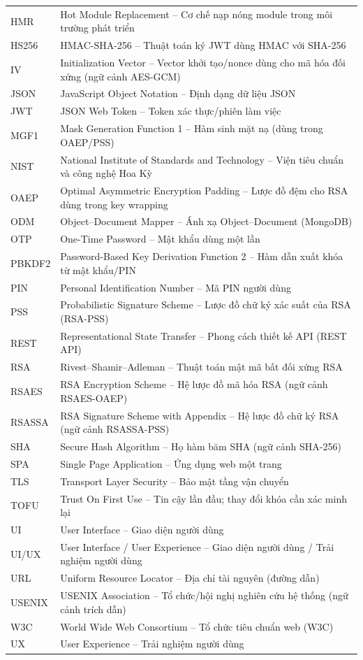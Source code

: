 \begin{longtable}{@{}p{}p{}@{}}
HMR   & Hot Module Replacement -- Cơ chế nạp nóng module trong môi trường phát triển \\
HS256 & HMAC-SHA-256 -- Thuật toán ký JWT dùng HMAC với SHA-256 \\
IV    & Initialization Vector -- Vector khởi tạo/nonce dùng cho mã hóa đối xứng (ngữ cảnh AES-GCM) \\
JSON  & JavaScript Object Notation -- Định dạng dữ liệu JSON \\
JWT   & JSON Web Token -- Token xác thực/phiên làm việc \\
MGF1  & Mask Generation Function 1 -- Hàm sinh mặt nạ (dùng trong OAEP/PSS) \\
NIST  & National Institute of Standards and Technology -- Viện tiêu chuẩn và công nghệ Hoa Kỳ \\
OAEP  & Optimal Asymmetric Encryption Padding -- Lược đồ đệm cho RSA dùng trong key wrapping \\
ODM   & Object--Document Mapper -- Ánh xạ Object--Document (MongoDB) \\
OTP   & One-Time Password -- Mật khẩu dùng một lần \\
PBKDF2& Password-Based Key Derivation Function 2 -- Hàm dẫn xuất khóa từ mật khẩu/PIN \\
PIN   & Personal Identification Number -- Mã PIN người dùng \\
PSS   & Probabilistic Signature Scheme -- Lược đồ chữ ký xác suất của RSA (RSA-PSS) \\
REST  & Representational State Transfer -- Phong cách thiết kế API (REST API) \\
RSA   & Rivest--Shamir--Adleman -- Thuật toán mật mã bất đối xứng RSA \\
RSAES & RSA Encryption Scheme -- Hệ lược đồ mã hóa RSA (ngữ cảnh RSAES-OAEP) \\
RSASSA& RSA Signature Scheme with Appendix -- Hệ lược đồ chữ ký RSA (ngữ cảnh RSASSA-PSS) \\
SHA   & Secure Hash Algorithm -- Họ hàm băm SHA (ngữ cảnh SHA-256) \\
SPA   & Single Page Application -- Ứng dụng web một trang \\
TLS   & Transport Layer Security -- Bảo mật tầng vận chuyển \\
TOFU  & Trust On First Use -- Tin cậy lần đầu; thay đổi khóa cần xác minh lại \\
UI    & User Interface -- Giao diện người dùng \\
UI/UX & User Interface / User Experience -- Giao diện người dùng / Trải nghiệm người dùng \\
URL   & Uniform Resource Locator -- Địa chỉ tài nguyên (đường dẫn) \\
USENIX& USENIX Association -- Tổ chức/hội nghị nghiên cứu hệ thống (ngữ cảnh trích dẫn) \\
W3C   & World Wide Web Consortium -- Tổ chức tiêu chuẩn web (W3C) \\
UX    & User Experience -- Trải nghiệm người dùng \\

\end{longtable}
